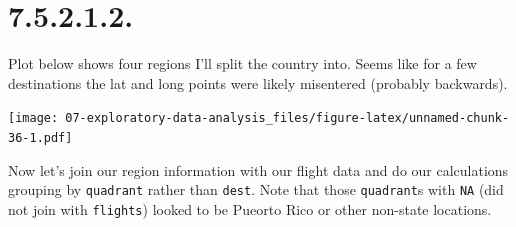 \documentclass[]{book}
\newenvironment{Shaded}{\begin{snugshade}}{\end{snugshade}}
\newcommand{\DataTypeTok}[1]{\textcolor[rgb]{0.13,0.29,0.53}{#1}}
\newcommand{\DecValTok}[1]{\textcolor[rgb]{0.00,0.00,0.81}{#1}}
\newcommand{\KeywordTok}[1]{\textcolor[rgb]{0.13,0.29,0.53}{\textbf{#1}}}
\newcommand{\NormalTok}[1]{#1}
\newcommand{\OperatorTok}[1]{\textcolor[rgb]{0.81,0.36,0.00}{\textbf{#1}}}
\newcommand{\OtherTok}[1]{\textcolor[rgb]{0.56,0.35,0.01}{#1}}
\newcommand{\StringTok}[1]{\textcolor[rgb]{0.31,0.60,0.02}{#1}}
\theoremstyle{definition}
\theoremstyle{definition}
\theoremstyle{definition}
\theoremstyle{remark}
\begin{document}
\hypertarget{section-26}{%
\section{7.5.2.1.2.}\label{section-26}}

Plot below shows four regions I'll split the country into. Seems like
for a few destinations the lat and long points were likely misentered
(probably backwards).

\begin{Shaded}
\end{Shaded}

\texttt{[image: 07-exploratory-data-analysis\_files/figure-latex/unnamed-chunk-36-1.pdf]}

Now let's join our region information with our flight data and do our
calculations grouping by \texttt{quadrant} rather than \texttt{dest}.
Note that those \texttt{quadrant}s with \texttt{NA} (did not join with
\texttt{flights}) looked to be Pueorto Rico or other non-state
locations.
\end{document}
